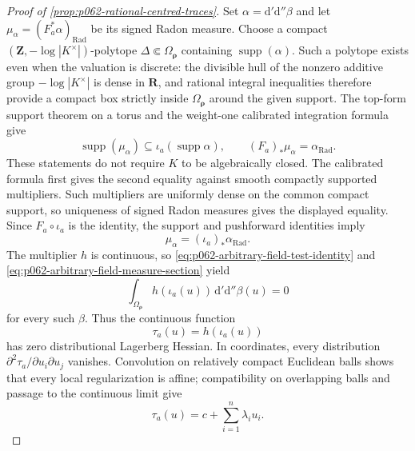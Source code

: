 \begin{proof}[Proof of \cref{prop:p062-rational-centred-traces}]
Set \(\alpha=\mathrm d'\mathrm d''\beta\) and let
\(\mu_\alpha=(F_a^*\alpha)_{\mathrm{Rad}}\) be its signed Radon
measure.  Choose a compact \((\mathbf Z,-\log|K^\times|)\)-polytope
\(\Delta\Subset\Omega_{\boldsymbol\rho}\) containing
\(\operatorname{supp}(\alpha)\).  Such a polytope exists even when the
valuation is discrete: the divisible hull of the nonzero additive group
\(-\log|K^\times|\) is dense in \(\mathbf R\), and rational integral
inequalities therefore provide a compact box strictly inside
\(\Omega_{\boldsymbol\rho}\) around the given support.  The top-form
support theorem on a torus
\cite[Proposition~2.3.6]{BGJKK25} and the weight-one calibrated
integration formula
\cite[Proposition~11.1 and Example~11.7]{GJR26} give
\begin{equation}\label{eq:p062-arbitrary-field-support-push}
 \operatorname{supp}(\mu_\alpha)
       \subseteq\iota_a(\operatorname{supp}\alpha),
 \qquad
 (F_a)_*\mu_\alpha=\alpha_{\mathrm{Rad}}.
\end{equation}
These statements do not require \(K\) to be algebraically closed.  The
calibrated formula first gives the second equality against smooth
compactly supported multipliers.  Such multipliers are uniformly dense
on the common compact support, so uniqueness of signed Radon measures
gives the displayed equality.  Since \(F_a\circ\iota_a\) is the identity,
the support and pushforward identities imply
\begin{equation}\label{eq:p062-arbitrary-field-measure-section}
                      \mu_\alpha
                         =(\iota_a)_*\alpha_{\mathrm{Rad}}.
\end{equation}
The multiplier \(h\) is continuous, so
\eqref{eq:p062-arbitrary-field-test-identity} and
\eqref{eq:p062-arbitrary-field-measure-section} yield
\begin{equation}\label{eq:p062-arbitrary-field-trace-hessian}
  \int_{\Omega_{\boldsymbol\rho}}
       h(\iota_a(u))\,\mathrm d'\mathrm d''\beta(u)=0
\end{equation}
for every such \(\beta\).  Thus the continuous function
\[
                    \tau_a(u)=h(\iota_a(u))
\]
has zero distributional Lagerberg Hessian.  In coordinates, every
distribution \(\partial^2\tau_a/\partial u_i\partial u_j\) vanishes.
Convolution on relatively compact Euclidean balls shows that every local
regularization is affine; compatibility on overlapping balls and passage
to the continuous limit give
\begin{equation}\label{eq:p062-arbitrary-field-affine-trace}
                    \tau_a(u)=c+\sum_{i=1}^n\lambda_i u_i.
\end{equation}


\end{proof}
